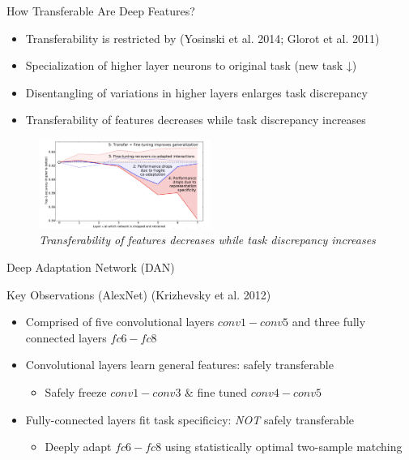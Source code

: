 \documentclass{beamer}
\begin{document}
\begin{frame}[fragile]{How Transferable Are Deep Features?}
\begin{itemize}
  \item{Transferability is restricted by (Yosinski et al. 2014; Glorot et al. 2011)}
  \item{Specialization of higher layer neurons to original task (new task ↓)}
  \item{Disentangling of variations in higher layers enlarges task discrepancy}
  \item{Transferability of features decreases while task discrepancy increases}
\end{itemize}
\begin{figure}[h]
    \centering
    \includegraphics[width=0.5\textwidth]{fig2}
    \caption{\emph{Transferability of features decreases while task discrepancy increases}}
    \label{fig:mesh2}
\end{figure}
\end{frame}

\begin{frame}[fragile]{Deep Adaptation Network (DAN)}
\begin{block}{Key Observations (AlexNet) (Krizhevsky et al. 2012)}
\begin{itemize}
  \item{Comprised of five convolutional layers $conv1-conv5$ and three fully connected layers $fc6-fc8$}
  \item{Convolutional layers learn general features: safely transferable} 
  \begin{itemize}
  \item{Safely freeze $conv1-conv3$ \& fine tuned $conv4-conv5$}
  \end{itemize}
  \item{Fully-connected layers fit task specificicy: \emph{NOT} safely transferable} 
  \begin{itemize}
  \item{Deeply adapt $fc6-fc8$ using statistically optimal two-sample matching}
  \end{itemize}
\end{itemize}
\end{block}
\end{frame}
\end{document}
